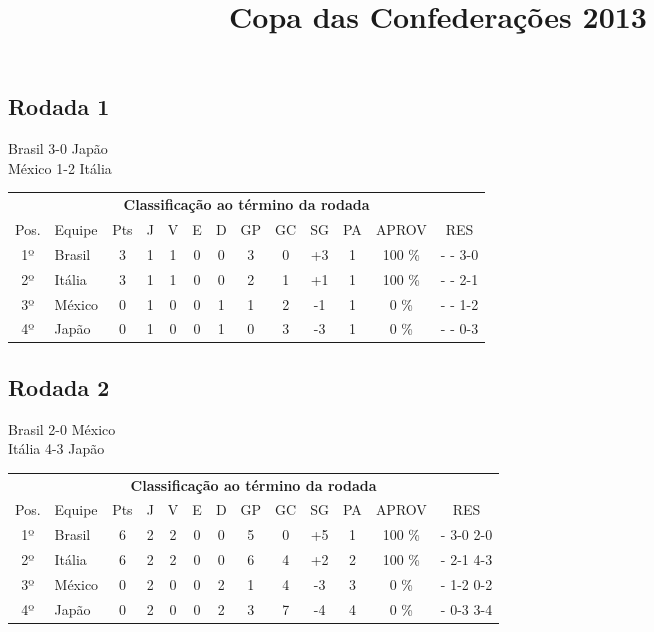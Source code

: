 \documentclass{article}
\title{\textbf{Copa das Confederações 2013}}
\author{}
\date{}
\begin{document}
\maketitle

\subsection*{Rodada 1}
Brasil 3-0 Japão\\
México 1-2 Itália\\
\begin{center}
\begin{tabular}{| c | l | c | c | c | c | c | c | c | c | c | c | c |}
\multicolumn{13}{c}{\textbf{Classificação ao término da rodada}}\\
Pos.&Equipe&Pts&J&V&E&D&GP&GC&SG&PA&APROV&RES\\
1º&Brasil              &3&1	&1&0&0	&3&0&+3	&1&100 \%	& -  - 3-0 \\
2º&Itália              &3&1	&1&0&0	&2&1&+1	&1&100 \%	& -  - 2-1 \\
3º&México              &0&1	&0&0&1	&1&2&-1	&1&  0 \%	& -  - 1-2 \\
4º&Japão               &0&1	&0&0&1	&0&3&-3	&1&  0 \%	& -  - 0-3 \\
\end{tabular}
\end{center}


\subsection*{Rodada 2}
Brasil 2-0 México\\
Itália 4-3 Japão\\
\begin{center}
\begin{tabular}{| c | l | c | c | c | c | c | c | c | c | c | c | c |}
\multicolumn{13}{c}{\textbf{Classificação ao término da rodada}}\\
Pos.&Equipe&Pts&J&V&E&D&GP&GC&SG&PA&APROV&RES\\
1º&Brasil              &6&2	&2&0&0	&5&0&+5	&1&100 \%	& - 3-0 2-0 \\
2º&Itália              &6&2	&2&0&0	&6&4&+2	&2&100 \%	& - 2-1 4-3 \\
3º&México              &0&2	&0&0&2	&1&4&-3	&3&  0 \%	& - 1-2 0-2 \\
4º&Japão               &0&2	&0&0&2	&3&7&-4	&4&  0 \%	& - 0-3 3-4 \\
\end{tabular}
\end{center}
\end{document}
